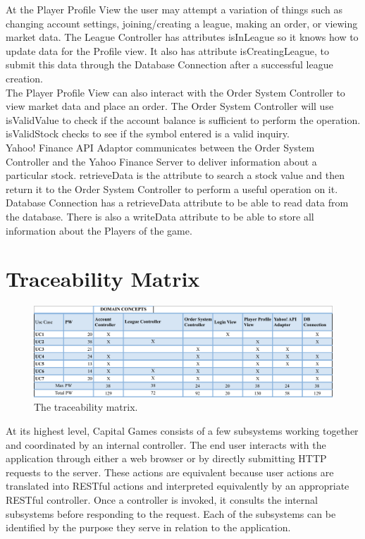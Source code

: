 At the Player Profile View the user may attempt a variation of things
such as changing account settings, joining/creating a league, making
an order, or viewing market data. The League Controller has attributes
isInLeague so it knows how to update data for the Profile view. It also
has attribute isCreatingLeague, to submit this data through the Database
Connection after a successful league creation. \\

The Player Profile View can also interact with the Order System Controller
to view market data and place an order. The Order System Controller will
use isValidValue to check if the account balance is sufficient to perform
the operation. isValidStock checks to see if the symbol entered is a valid inquiry. \\


Yahoo! Finance API Adaptor communicates between the Order System Controller
and the Yahoo Finance Server to deliver information about a particular stock.
retrieveData is the attribute to search a stock value and then return it to
the Order System Controller to perform a useful operation on it.\\

Database Connection has a retrieveData attribute to be able to read data
from the database. There is also a writeData attribute to be able to store
all information about the Players of the game.\\


\newpage

\section{Traceability Matrix}

\begin{figure}[H]
\centering
\includegraphics[width=5.5in]{./img/tracedomain.png}
\caption{The traceability matrix.}
\end{figure}





\iffalse
At its highest level, Capital Games consists of a few subsystems
working together and coordinated by an internal controller. The
end user interacts with the application through either a web browser
or by directly submitting HTTP requests to the server. These actions
are equivalent because user actions are translated into RESTful actions
and interpreted equivalently by an appropriate RESTful controller. \cite{wiki:restful}
Once a controller is invoked, it consults the 
internal subsystems before responding to the request. Each of the 
subsystems can be identified by the purpose they serve in relation
to the application. 

